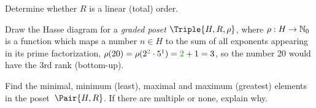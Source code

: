 \documentclass[a4paper,12pt]{article}
\begin{document}
\begin{tasks}
\begin{subtasks}
        \item Determine whether $R$ is a linear (total) order.

        \item Draw the Hasse diagram for a \textit{graded poset} $\Triple{H, R, \rho}$, where $\rho : H \to \mathbb{N}_{0}$ is a function which maps a number $n \in H$ to the sum of all exponents appearing in its prime factorization, \eg $\rho(20) = \rho(2^{\mathcolor{my-green}{2}} \cdot 5^{\textcolor{my-blue}{1}}) = \mathcolor{my-green}{2} + \textcolor{my-blue}{1} = 3$, so the number 20 would have the 3rd rank (bottom-up).

        \item Find the minimal, minimum (least), maximal and maximum (greatest) elements in the poset~$\Pair{H, R}$.
        If there are multiple or none, explain why.

    \end{subtasks}



\end{tasks}
\end{document}
